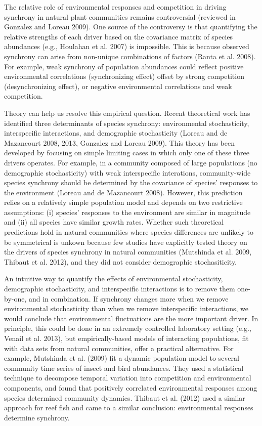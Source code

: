 \documentclass[12pt,]{article}
\begin{document}
The relative role of environmental responses and competition in driving synchrony  in natural plant communities
remains controversial (reviewed in Gonzalez and Loreau 2009). One source
of the controversy is that quantifying the relative strengths of each
driver based on the covariance matrix of species abundances (e.g.,
Houlahan et al. 2007) is impossible. This is because observed synchrony
can arise from non-unique combinations of factors (Ranta et al. 2008).
For example, weak synchrony of population abundances could reflect
positive environmental correlations (synchronizing effect) offset by
strong competition (desynchronizing effect), or negative environmental
correlations and weak competition.

Theory can help us resolve this empirical question.
Recent theoretical work has identified three determinants of species
synchrony: environmental stochasticity, interspecific interactions, and
demographic stochasticity (Loreau and {{de Mazancourt}} 2008, 2013,
Gonzalez and Loreau 2009).
This theory has been developed by focusing on simple limiting cases in which only one of these three drivers operates.
For example, in a community composed of large populations (no
demographic stochasticity) with weak interspecific interations,
community-wide species synchrony should be determined by the covariance
of species' responses to the environment (Loreau and {{de Mazancourt}}
2008). However, this prediction relies on a relatively simple population
model and depends on two restrictive assumptions: (i)
species' responses to the environment are similar in magnitude and (ii)
all species have similar growth rates. Whether such theoretical
predictions hold in natural communities where species differences are
unlikely to be symmetrical is unkown because few studies have explicitly
tested theory on the drivers of species synchrony in natural communities
(Mutshinda et al. 2009, Thibaut et al. 2012), and they did not consider
demographic stochasiticity.

An intuitive way to quantify the effects of environmental stochasticity,
demographic stochasticity, and interspecific interactions is to remove
them one-by-one, and in combination.
If synchrony changes more when we remove environmental stochasticity than when we remove interspecific interactions, we would conclude that environmental fluctuations are the more important driver.
In principle, this could be done in an extremely controlled laboratory
setting (e.g., Venail et al. 2013), but empirically-based models of
interacting populations, fit with data sets from natural communities,
offer a practical alternative. For example, Mutshinda et al. (2009) fit
a dynamic population model to several community time series of insect
and bird abundances. They used a statistical technique to decompose
temporal variation into competition and environmental components, and
found that positively correlated environmental responses among species
determined community dynamics. Thibaut et al. (2012) used a similar
approach for reef fish and came to a similar conclusion: environmental
responses determine synchrony.
\end{document}
